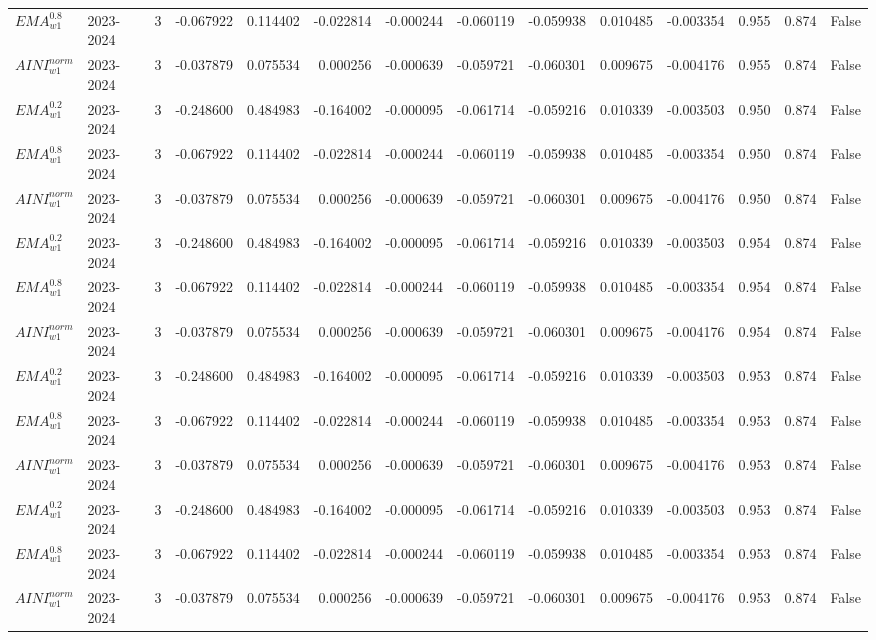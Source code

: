 \begin{tabular}{@{}llrrrrrrrrrlll@{}}
$EMA^{0.8}_{w1}$ & 2023-2024 & 3 & -0.067922 & 0.114402 & -0.022814 & -0.000244 & -0.060119 & -0.059938 & 0.010485 & -0.003354 & 0.955 & 0.874 & False \\
$AINI^{norm}_{w1}$ & 2023-2024 & 3 & -0.037879 & 0.075534 & 0.000256 & -0.000639 & -0.059721 & -0.060301 & 0.009675 & -0.004176 & 0.955 & 0.874 & False \\
$EMA^{0.2}_{w1}$ & 2023-2024 & 3 & -0.248600 & 0.484983 & -0.164002 & -0.000095 & -0.061714 & -0.059216 & 0.010339 & -0.003503 & 0.950 & 0.874 & False \\
$EMA^{0.8}_{w1}$ & 2023-2024 & 3 & -0.067922 & 0.114402 & -0.022814 & -0.000244 & -0.060119 & -0.059938 & 0.010485 & -0.003354 & 0.950 & 0.874 & False \\
$AINI^{norm}_{w1}$ & 2023-2024 & 3 & -0.037879 & 0.075534 & 0.000256 & -0.000639 & -0.059721 & -0.060301 & 0.009675 & -0.004176 & 0.950 & 0.874 & False \\
$EMA^{0.2}_{w1}$ & 2023-2024 & 3 & -0.248600 & 0.484983 & -0.164002 & -0.000095 & -0.061714 & -0.059216 & 0.010339 & -0.003503 & 0.954 & 0.874 & False \\
$EMA^{0.8}_{w1}$ & 2023-2024 & 3 & -0.067922 & 0.114402 & -0.022814 & -0.000244 & -0.060119 & -0.059938 & 0.010485 & -0.003354 & 0.954 & 0.874 & False \\
$AINI^{norm}_{w1}$ & 2023-2024 & 3 & -0.037879 & 0.075534 & 0.000256 & -0.000639 & -0.059721 & -0.060301 & 0.009675 & -0.004176 & 0.954 & 0.874 & False \\
$EMA^{0.2}_{w1}$ & 2023-2024 & 3 & -0.248600 & 0.484983 & -0.164002 & -0.000095 & -0.061714 & -0.059216 & 0.010339 & -0.003503 & 0.953 & 0.874 & False \\
$EMA^{0.8}_{w1}$ & 2023-2024 & 3 & -0.067922 & 0.114402 & -0.022814 & -0.000244 & -0.060119 & -0.059938 & 0.010485 & -0.003354 & 0.953 & 0.874 & False \\
$AINI^{norm}_{w1}$ & 2023-2024 & 3 & -0.037879 & 0.075534 & 0.000256 & -0.000639 & -0.059721 & -0.060301 & 0.009675 & -0.004176 & 0.953 & 0.874 & False \\
$EMA^{0.2}_{w1}$ & 2023-2024 & 3 & -0.248600 & 0.484983 & -0.164002 & -0.000095 & -0.061714 & -0.059216 & 0.010339 & -0.003503 & 0.953 & 0.874 & False \\
$EMA^{0.8}_{w1}$ & 2023-2024 & 3 & -0.067922 & 0.114402 & -0.022814 & -0.000244 & -0.060119 & -0.059938 & 0.010485 & -0.003354 & 0.953 & 0.874 & False \\
$AINI^{norm}_{w1}$ & 2023-2024 & 3 & -0.037879 & 0.075534 & 0.000256 & -0.000639 & -0.059721 & -0.060301 & 0.009675 & -0.004176 & 0.953 & 0.874 & False \\

\end{tabular}
